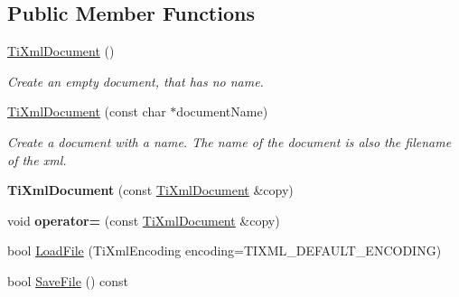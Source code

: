 \subsection*{\-Public \-Member \-Functions}
\begin{DoxyCompactItemize}
\item 
\hypertarget{classTiXmlDocument_a9f5e84335708fde98400230f9f12659c}{
\hyperlink{classTiXmlDocument_a9f5e84335708fde98400230f9f12659c}{\-Ti\-Xml\-Document} ()}
\label{df/d09/classTiXmlDocument_a9f5e84335708fde98400230f9f12659c}

\begin{DoxyCompactList}\small\item\em \-Create an empty document, that has no name. \end{DoxyCompactList}\item 
\hypertarget{classTiXmlDocument_ae4508b452d0c3061db085f3db27b8396}{
\hyperlink{classTiXmlDocument_ae4508b452d0c3061db085f3db27b8396}{\-Ti\-Xml\-Document} (const char $\ast$document\-Name)}
\label{df/d09/classTiXmlDocument_ae4508b452d0c3061db085f3db27b8396}

\begin{DoxyCompactList}\small\item\em \-Create a document with a name. \-The name of the document is also the filename of the xml. \end{DoxyCompactList}\item 
\hypertarget{classTiXmlDocument_a323a7486e7da6099cdc19a5ff7e74b07}{
{\bfseries \-Ti\-Xml\-Document} (const \hyperlink{classTiXmlDocument}{\-Ti\-Xml\-Document} \&copy)}
\label{df/d09/classTiXmlDocument_a323a7486e7da6099cdc19a5ff7e74b07}

\item 
\hypertarget{classTiXmlDocument_aafbfacc3414008f619b1345775ef12a4}{
void {\bfseries operator=} (const \hyperlink{classTiXmlDocument}{\-Ti\-Xml\-Document} \&copy)}
\label{df/d09/classTiXmlDocument_aafbfacc3414008f619b1345775ef12a4}

\item 
bool \hyperlink{classTiXmlDocument_a4c852a889c02cf251117fd1d9fe1845f}{\-Load\-File} (\-Ti\-Xml\-Encoding encoding=\-T\-I\-X\-M\-L\-\_\-\-D\-E\-F\-A\-U\-L\-T\-\_\-\-E\-N\-C\-O\-D\-I\-N\-G)
\item 
\hypertarget{classTiXmlDocument_a21c0aeb0d0a720169ad4ac89523ebe93}{
bool \hyperlink{classTiXmlDocument_a21c0aeb0d0a720169ad4ac89523ebe93}{\-Save\-File} () const }
\label{df/d09/classTiXmlDocument_a21c0aeb0d0a720169ad4ac89523ebe93}


\end{DoxyCompactItemize}
